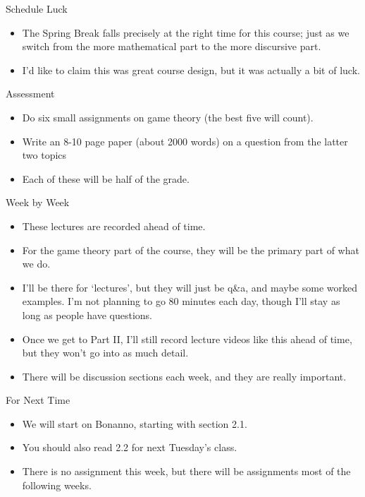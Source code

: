 \documentclass[
  ignorenonframetext,
]{beamer}
\providecommand{\tightlist}{%
  \setlength{\itemsep}{0pt}\setlength{\parskip}{0pt}}
\begin{document}
\begin{frame}{Schedule Luck}
\protect\hypertarget{schedule-luck}{}
\begin{itemize}
\tightlist
\item
  The Spring Break falls precisely at the right time for this course;
  just as we switch from the more mathematical part to the more
  discursive part.
\item
  I'd like to claim this was great course design, but it was actually a
  bit of luck.
\end{itemize}
\end{frame}

\begin{frame}{Assessment}
\protect\hypertarget{assessment}{}
\begin{itemize}[<+->]
\tightlist
\item
  Do six small assignments on game theory (the best five will count).
\item
  Write an 8-10 page paper (about 2000 words) on a question from the
  latter two topics
\item
  Each of these will be half of the grade.
\end{itemize}
\end{frame}

\begin{frame}{Week by Week}
\protect\hypertarget{week-by-week}{}
\begin{itemize}[<+->]
\tightlist
\item
  These lectures are recorded ahead of time.
\item
  For the game theory part of the course, they will be the primary part
  of what we do.
\item
  I'll be there for `lectures', but they will just be q\&a, and maybe
  some worked examples. I'm not planning to go 80 minutes each day,
  though I'll stay as long as people have questions.
\item
  Once we get to Part II, I'll still record lecture videos like this
  ahead of time, but they won't go into as much detail.
\item
  There will be discussion sections each week, and they are really
  important.
\end{itemize}
\end{frame}

\begin{frame}{For Next Time}
\protect\hypertarget{for-next-time}{}
\begin{itemize}
\tightlist
\item
  We will start on Bonanno, starting with section 2.1.
\item
  You should also read 2.2 for next Tuesday's class.
\item
  There is no assignment this week, but there will be assignments most
  of the following weeks.
\end{itemize}
\end{frame}
\end{document}
